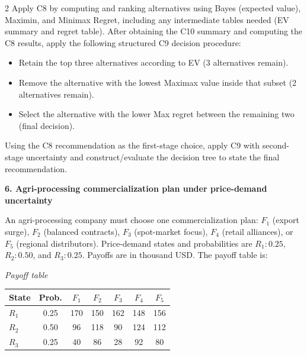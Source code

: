 \documentclass[12pt]{article}
\newcommand{\SubsectionBox}[1]{%
	\noindent\colorbox{gray!30}{%
		\parbox{\linewidth}{\textbf{#1}}%
	}\par\vspace{0.35cm}%
}
\begin{document}
\begin{multicols}{2}
		Apply C8 by computing and ranking alternatives using Bayes (expected value), Maximin, and Minimax Regret, including any intermediate tables needed (EV summary and regret table).
		After obtaining the C10 summary and computing the C8 results, apply the following structured C9 decision procedure:
		\begin{itemize}
			\item Retain the top three alternatives according to EV (3 alternatives remain).
			\item Remove the alternative with the lowest Maximax value inside that subset (2 alternatives remain).
			\item Select the alternative with the lower Max regret between the remaining two (final decision).
		\end{itemize}
		Using the C8 recommendation as the first-stage choice, apply C9 with second-stage uncertainty and construct/evaluate the decision tree to state the final recommendation.

		\vspace{0.25cm}
		\SubsectionBox{6. Agri-processing commercialization plan under price-demand uncertainty}\vspace{-0.25cm}
		An agri-processing company must choose one commercialization plan: $F_1$ (export surge), $F_2$ (balanced contracts), $F_3$ (spot-market focus), $F_4$ (retail alliances), or $F_5$ (regional distributors).
		Price-demand states and probabilities are $R_1:0.25$, $R_2:0.50$, and $R_3:0.25$. Payoffs are in thousand USD. The payoff table is:
		
		\begin{center}
			\textit{Payoff table} \\
			\begin{tabular}{l c c c c c c}
				\hline
				State& Prob. & $F_1$ & $F_2$ & $F_3$ & $F_4$ & $F_5$ \\
				\hline
				$R_1$ & 0.25 & 170 & 150 & 162 & 148 & 156 \\
				$R_2$ & 0.50 & 96 & 118 & 90 & 124 & 112 \\
				$R_3$ & 0.25 & 40 & 86 & 28 & 92 & 80 \\
				\hline
			\end{tabular}
		\end{center}
		

\end{multicols}
\end{document}
